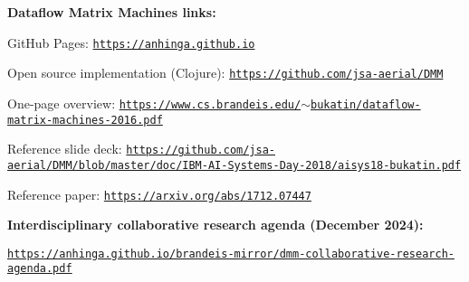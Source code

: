 \documentclass{article}
\begin{document}
\vspace{0.2in}
\noindent
{\bf Dataflow Matrix Machines links:}

\vspace{0.1in}
GitHub Pages: \href{https://anhinga.github.io/}{\tt https://anhinga.github.io}

\vspace{0.1in}
Open source implementation (Clojure): \href{https://github.com/jsa-aerial/DMM}{\tt https://github.com/jsa-aerial/DMM}

\vspace{0.1in}
One-page overview: \href{https://www.cs.brandeis.edu/~bukatin/dataflow-matrix-machines-2016.pdf}{\tt https://www.cs.brandeis.edu/$\sim$bukatin/dataflow-matrix-machines-2016.pdf}

\vspace{0.1in}
Reference slide deck: \href{https://github.com/jsa-aerial/DMM/blob/master/doc/IBM-AI-Systems-Day-2018/aisys18-bukatin.pdf}{\scriptsize\tt https://github.com/jsa-aerial/DMM/blob/master/doc/IBM-AI-Systems-Day-2018/aisys18-bukatin.pdf}

\vspace{0.1in}
Reference paper: \href{https://arxiv.org/abs/1712.07447}{\tt https://arxiv.org/abs/1712.07447}

\vspace{0.3in}
\noindent
{\bf Interdisciplinary collaborative research agenda (December 2024):}

\vspace{0.1in}
\href{https://anhinga.github.io/brandeis-mirror/dmm-collaborative-research-agenda.pdf}{\tt https://anhinga.github.io/brandeis-mirror/dmm-collaborative-research-agenda.pdf}
\end{document}
